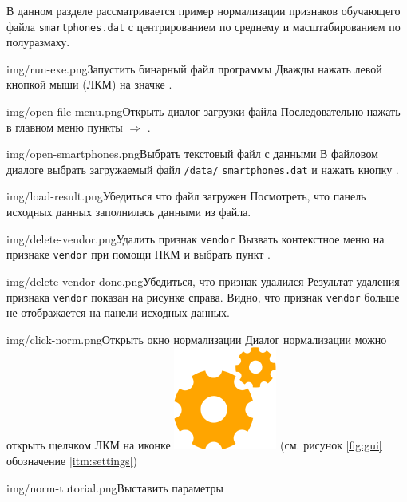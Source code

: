 \documentclass[12pt,tikz]{instruction}
\begin{document}
В данном разделе рассматривается пример нормализации признаков обучающего файла \texttt{smartphones.dat} с центрированием по среднему и масштабированием по полуразмаху. 

\begin{steps}
	\begin{ist}{img/run-exe.png}{Запустить бинарный файл программы}		
		Дважды нажать левой кнопкой мыши (ЛКМ) на значке \ExeFile. 
	\end{ist}
	\begin{ist}{img/open-file-menu.png}{Открыть диалог загрузки файла}		
		Последовательно нажать в главном меню пункты  $ \Rightarrow $ .
	\end{ist}
	\begin{ist}{img/open-smartphones.png}{Выбрать текстовый файл с данными}
		В файловом диалоге выбрать загружаемый файл \texttt{\SysName /data/} \texttt{smartphones.dat} и нажать кнопку .
	\end{ist}
	\begin{ist}{img/load-result.png}{Убедиться что файл загружен}
		Посмотреть, что панель исходных данных заполнилась данными из файла.		
	\end{ist}
	\begin{ist}{img/delete-vendor.png}{Удалить признак \texttt{vendor}}
		Вызвать контекстное меню на признаке \texttt{vendor} при помощи ПКМ и выбрать пункт .
	\end{ist}
	\begin{ist}{img/delete-vendor-done.png}{Убедиться, что признак удалился}
		Результат удаления признака \texttt{vendor} показан на рисунке справа. Видно, что признак \texttt{vendor} больше не отображается на панели исходных данных. 
	\end{ist}	
	\begin{ist}{img/click-norm.png}{Открыть окно нормализации}
		Диалог нормализации можно открыть щелчком ЛКМ на иконке \includegraphics[scale=0.1]{img/settings.png} (см. рисунок \ref{fig:gui} обозначение \ref{itm:settings})
	\end{ist}
	\begin{ist}{img/norm-tutorial.png}{Выставить параметры}

\end{ist}
\end{steps}
\end{document}
